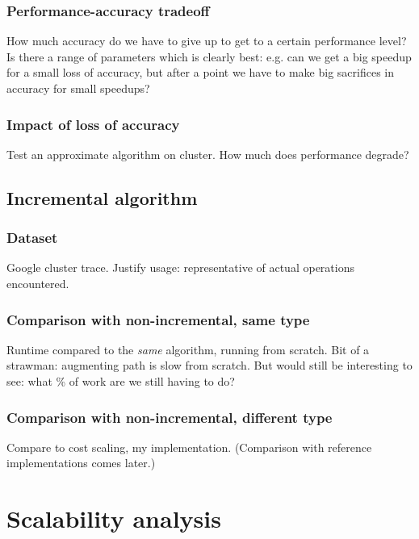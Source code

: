 \subsubsection{Performance-accuracy tradeoff}

How much accuracy do we have to give up to get to a certain performance level? Is there a range of parameters which is clearly best: e.g. can we get a big speedup for a small loss of accuracy, but after a point we have to make big sacrifices in accuracy for small speedups?

\subsubsection{Impact of loss of accuracy}

Test an approximate algorithm on cluster. How much does performance degrade?

\subsection{Incremental algorithm} \label{sec:eval-incremental}

\subsubsection{Dataset}

Google cluster trace. Justify usage: representative of actual operations encountered.

\subsubsection{Comparison with non-incremental, same type}

Runtime compared to the {\it same} algorithm, running from scratch. Bit of a strawman: augmenting path is slow from scratch. But would still be interesting to see: what \% of work are we still having to do?

\subsubsection{Comparison with non-incremental, different type}

Compare to cost scaling, my implementation. (Comparison with reference implementations comes later.)

\section{Scalability analysis}

